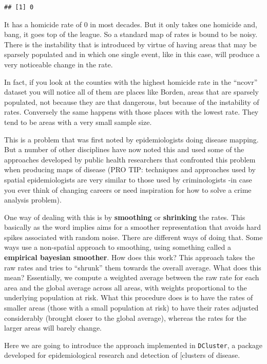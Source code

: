 \documentclass[
  krantz2]{krantz}
\begin{document}
\begin{verbatim}
## [1] 0
\end{verbatim}

It has a homicide rate of 0 in most decades. But it only takes one homicide and, bang, it goes top of the league. So a standard map of rates is bound to be noisy. There is the instability that is introduced by virtue of having areas that may be sparsely populated and in which one single event, like in this case, will produce a very noticeable change in the rate.

In fact, if you look at the counties with the highest homicide rate in the ``ncovr'' dataset you will notice all of them are places like Borden, areas that are sparsely populated, not because they are that dangerous, but because of the instability of rates. Conversely the same happens with those places with the lowest rate. They tend to be areas with a very small sample size.

This is a problem that was first noted by epidemiologists doing disease mapping. But a number of other disciplines have now noted this and used some of the approaches developed by public health researchers that confronted this problem when producing maps of disease (PRO TIP: techniques and approaches used by spatial epidemiologists are very similar to those used by criminologists -in case you ever think of changing careers or need inspiration for how to solve a crime analysis problem).

One way of dealing with this is by \textbf{smoothing} or \textbf{shrinking} the rates. This basically as the word implies aims for a smoother representation that avoids hard spikes associated with random noise. There are different ways of doing that. Some ways use a non-spatial approach to smoothing, using something called a \textbf{empirical bayesian smoother}. How does this work? This approach takes the raw rates and tries to ``shrunk'' them towards the overall average. What does this mean? Essentially, we compute a weighted average between the raw rate for each area and the global average across all areas, with weights proportional to the underlying population at risk. What this procedure does is to have the rates of smaller areas (those with a small population at risk) to have their rates adjusted considerably (brought closer to the global average), whereas the rates for the larger areas will barely change.

Here we are going to introduce the approach implemented in \texttt{DCluster}, a package developed for epidemiological research and detection of {[}clusters of disease.
\end{document}
